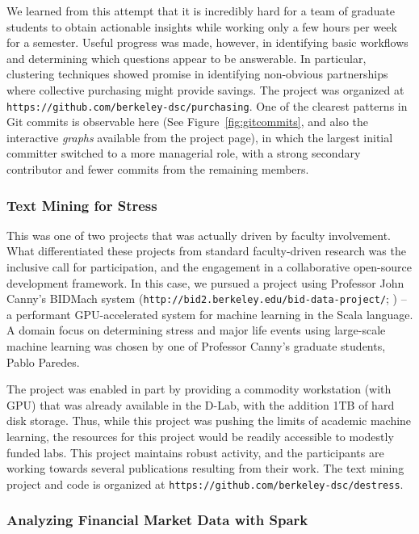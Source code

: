 \documentclass{sig-alternate}
\begin{document}
We learned from this attempt that it is incredibly hard for a team of graduate students to obtain actionable insights while working only a few hours per week for a semester. Useful progress was made, however, in identifying basic workflows and determining which questions appear to be answerable. In particular, clustering techniques showed promise in identifying non-obvious partnerships where collective purchasing might provide savings. The project was organized at \texttt{https://github.com/berkeley-dsc/purchasing}. One of the clearest patterns in Git commits is observable here (See Figure~\ref{fig:gitcommits}, and also the interactive \emph{graphs} available from the project page), in which the largest initial committer switched to a more managerial role, with a strong secondary contributor and fewer commits from the remaining members.

\subsubsection*{Text Mining for Stress}

This was one of two projects that was actually driven by faculty involvement. What differentiated these projects from standard faculty-driven research was the inclusive call for participation, and the engagement in a collaborative open-source development framework. In this case, we pursued a project using Professor John Canny's BIDMach system (\texttt{http://bid2.berkeley.edu/bid-data-project/}; \cite{canny2013bidmach}) -- a performant GPU-accelerated system for machine learning in the Scala language. A domain focus on determining stress and major life events using large-scale machine learning was chosen by one of Professor Canny's graduate students, Pablo Paredes.

The project was enabled in part by providing a commodity workstation (with GPU) that was already available in the D-Lab, with the addition 1TB of hard disk storage. Thus, while this project was pushing the limits of academic machine learning, the resources for this project would be readily accessible to modestly funded labs. This project maintains robust activity, and the participants are working towards several publications resulting from their work. The text mining project and code is organized at \texttt{https://github.com/berkeley-dsc/destress}.

\subsubsection*{Analyzing Financial Market Data with Spark}
\end{document}
